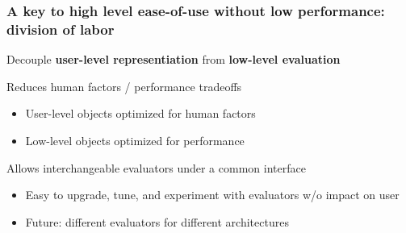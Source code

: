 \documentclass[10pt,xcolor=dvipsnames]{beamer}
\begin{document}
\frame
{
  \frametitle{A key to high level ease-of-use
without low performance: division of labor}

  \begin{alertblock}{Decouple {\bf user-level representiation}
from {\bf low-level evaluation}}
  \end{alertblock}

  \begin{block}{Reduces human factors / performance tradeoffs}
  \begin{itemize}
  \item User-level objects optimized for human factors
  \item Low-level objects optimized for performance
  \end{itemize}
  \end{block}

  \begin{block}{Allows interchangeable evaluators under a common interface}
  \begin{itemize}
  \item Easy to upgrade, tune, and experiment with evaluators w/o impact on user
  \item Future: different evaluators for different architectures
  \end{itemize}
  \end{block}
}
\end{document}
